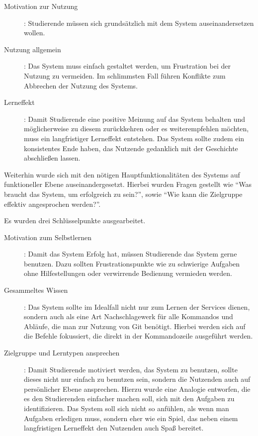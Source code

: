 \begin{description}
    \item[Motivation zur Nutzung]: Studierende müssen sich grundsätzlich mit dem System auseinandersetzen wollen.
    \item[Nutzung allgemein]: Das System muss einfach gestaltet werden, um Frustration bei der Nutzung zu vermeiden. Im schlimmsten Fall führen Konflikte zum Abbrechen der Nutzung des Systems.
    \item[Lerneffekt]: Damit Studierende eine positive Meinung auf das System behalten und möglicherweise zu diesem zurückkehren oder es weiterempfehlen möchten, muss ein langfristiger Lerneffekt entstehen. Das System sollte zudem ein konsistentes Ende haben, das Nutzende gedanklich mit der Geschichte abschließen lassen.
\end{description}

\par

Weiterhin wurde sich mit den nötigen Hauptfunktionalitäten des Systems auf funktioneller Ebene auseinandergesetzt.
Hierbei wurden Fragen gestellt wie ``Was braucht das System, um erfolgreich zu sein?'', sowie 
``Wie kann die Zielgruppe effektiv angesprochen werden?''.
\par
Es wurden drei Schlüsselpunkte ausgearbeitet.
\begin{description}
    \item[Motivation zum Selbstlernen]: Damit das System Erfolg hat, müssen Studierende das System gerne benutzen. Dazu sollten Frustrationspunkte wie zu schwierige Aufgaben ohne Hilfestellungen oder verwirrende Bedienung vermieden werden.
    \item[Gesammeltes Wissen]: Das System sollte im Idealfall nicht nur zum Lernen der Services dienen, sondern auch als eine Art Nachschlagewerk für alle Kommandos und Abläufe, die man zur Nutzung von Git benötigt. Hierbei werden sich auf die Befehle fokussiert, die direkt in der Kommandozeile ausgeführt werden.
    \item[Zielgruppe und Lerntypen ansprechen]: Damit Studierende motiviert werden, das System zu benutzen, sollte dieses nicht nur einfach zu benutzen sein, sondern die Nutzenden auch auf persönlicher Ebene ansprechen. Hierzu wurde eine Analogie entworfen, die es den Studierenden einfacher machen soll, sich mit den Aufgaben zu identifizieren. Das System soll sich nicht so anfühlen, als wenn man Aufgaben erledigen muss, sondern eher wie ein Spiel, das neben einem langfristigen Lerneffekt den Nutzenden auch Spaß bereitet.
\end{description}

